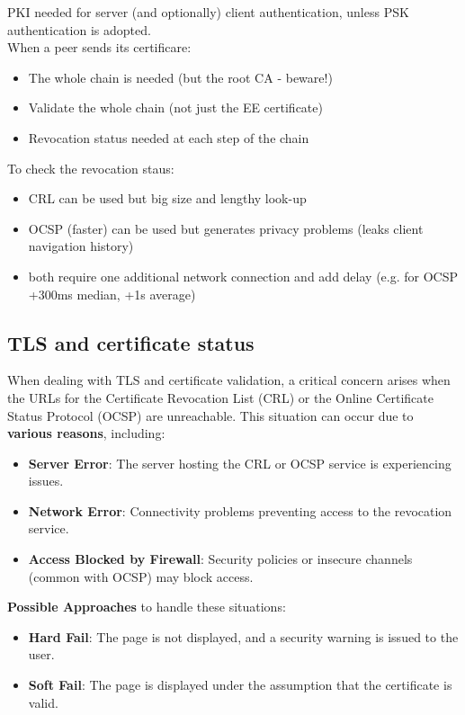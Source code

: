 PKI needed for server (and optionally) client authentication, unless PSK authentication is adopted. \\
When a peer sends its certificare:
\begin{itemize}
    \item The whole chain is needed (but the root CA - beware!)
    \item Validate the whole chain (not just the EE certificate)
    \item Revocation status needed at each step of the chain
\end{itemize}

To check the revocation staus:
\begin{itemize}
    \item CRL can be used but big size and lengthy look-up
    \item OCSP (faster) can be used but generates privacy problems (leaks client navigation history)
    \item both require one additional network connection and add delay (e.g. for OCSP +300ms median, +1s average)
\end{itemize}

\subsection{TLS and certificate status}

When dealing with TLS and certificate validation, a critical concern arises when the URLs for the Certificate Revocation List (CRL) or the Online Certificate Status Protocol (OCSP) are unreachable. This situation can occur due to \textbf{various reasons}, including:
\begin{itemize}
    \item \textbf{Server Error}: The server hosting the CRL or OCSP service is experiencing issues.
    \item \textbf{Network Error}: Connectivity problems preventing access to the revocation service.
    \item \textbf{Access Blocked by Firewall}: Security policies or insecure channels (common with OCSP) may block access.
\end{itemize}

\textbf{Possible Approaches} to handle these situations:

\begin{itemize}
    \item \textbf{Hard Fail}: The page is not displayed, and a security warning is issued to the user.
    \item \textbf{Soft Fail}: The page is displayed under the assumption that the certificate is valid.
\end{itemize}

